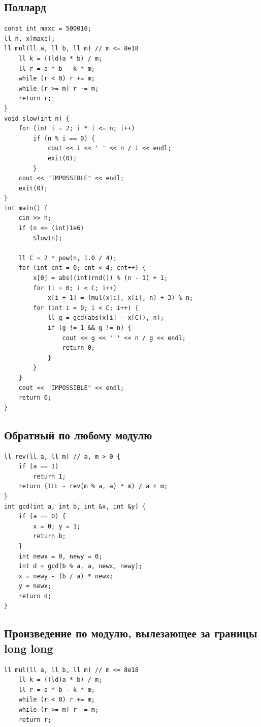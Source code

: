 \documentclass[10pt, portrait,letterpaper]{article}
\begin{document}
\subsection{Поллард}

\begin{verbatim}
const int maxc = 500010;
ll n, x[maxc];
ll mul(ll a, ll b, ll m) // m <= 8e18
    ll k = ((ld)a * b) / m;
    ll r = a * b - k * m;
    while (r < 0) r += m;
    while (r >= m) r -= m;
    return r;
}
void slow(int n) {
    for (int i = 2; i * i <= n; i++)
        if (n % i == 0) {
            cout << i << ' ' << n / i << endl;
            exit(0);
        }
    cout << "IMPOSSIBLE" << endl;
    exit(0);
}
int main() {
    cin >> n;
    if (n <= (int)1e6)
        Slow(n);

    ll C = 2 * pow(n, 1.0 / 4);
    for (int cnt = 0; cnt < 4; cnt++) {
        x[0] = abs((int)rnd()) % (n - 1) + 1;
        for (i = 0; i < C; i++)
            x[i + 1] = (mul(x[i], x[i], n) + 3) % n;
        for (int i = 0; i < C; i++) {
            ll g = gcd(abs(x[i] - x[C]), n);
            if (g != 1 && g != n) {
                cout << g << ' ' << n / g << endl;
                return 0;
            }
        }
    }
    cout << "IMPOSSIBLE" << endl;
    return 0;
}
\end{verbatim}

\subsection{Обратный по любому модулю}

\begin{verbatim}
ll rev(ll a, ll m) // a, m > 0 {
    if (a == 1)
        return 1;
    return (1LL - rev(m % a, a) * m) / a + m;
}
int gcd(int a, int b, int &x, int &y) {
	if (a == 0) {
		x = 0; y = 1;
		return b;
	}
	int newx = 0, newy = 0;
	int d = gcd(b % a, a, newx, newy);
	x = newy - (b / a) * newx;
	y = newx;
	return d;
}
\end{verbatim}

\subsection{Произведение по модулю, вылезающее за границы long long}
\begin{verbatim}
ll mul(ll a, ll b, ll m) // m <= 8e18
    ll k = ((ld)a * b) / m;
    ll r = a * b - k * m;
    while (r < 0) r += m;
    while (r >= m) r -= m;
    return r;
\end{verbatim}
\end{document}
